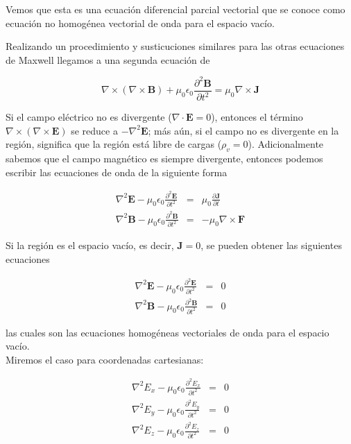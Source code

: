 Vemos que esta es una ecuación diferencial parcial vectorial que se conoce como ecuación no homogénea vectorial de onda para el espacio vacío. 

Realizando un procedimiento y susticuciones similares para las otras ecuaciones de Maxwell llegamos a una segunda ecuación de 

\begin{equation*}
\nabla \times \left( \nabla \times \mathbf{B} \right) + \mu_0 \epsilon_0 \frac{\partial^2 \mathbf{B}}{\partial t^2} = \mu_0 \nabla \times \mathbf{J}
\end{equation*}

Si el campo eléctrico no es divergente ($\nabla \cdot \mathbf{E}=0$), entonces el término $\nabla \times (\nabla \times \mathbf{E})$ se reduce a $-\nabla^2 \mathbf{E}$; más aún, si el campo no es divergente en la región, significa que la región está libre de cargas ($\rho_v=0$). Adicionalmente sabemos que el campo magnético es siempre divergente, entonces podemos escribir las ecuaciones de onda de la siguiente forma

\begin{eqnarray*}
\nabla^2 \mathbf{E} - \mu_0 \epsilon_0 \frac{\partial^2 \mathbf{E}}{\partial t^2} &=& \mu_0 \frac{\partial \mathbf{J}}{\partial t} \\
\nabla^2 \mathbf{B} - \mu_0 \epsilon_0 \frac{\partial^2 \mathbf{B}}{\partial t^2} &=& -\mu_0 \nabla \times \mathbf{F}
\end{eqnarray*}


Si la región es el espacio vacío, es decir, $\mathbf{J}=0$, se pueden obtener las siguientes ecuaciones 

\begin{eqnarray*}
\nabla^2 \mathbf{E} - \mu_0 \epsilon_0 \frac{\partial^2 \mathbf{E}}{\partial t^2} &=& 0 \\
\nabla^2 \mathbf{B} - \mu_0 \epsilon_0 \frac{\partial^2 \mathbf{B}}{\partial t^2} &=& 0
\end{eqnarray*}

las cuales son las ecuaciones homogéneas vectoriales de onda para el espacio vacío.\\


Miremos el caso para coordenadas cartesianas:

\begin{eqnarray*}
\nabla^2 E_x - \mu_0 \epsilon_0 \frac{\partial^2 E_x}{\partial t^2} &=& 0 \\
\nabla^2 E_y - \mu_0 \epsilon_0 \frac{\partial^2 E_y}{\partial t^2} &=& 0 \\
\nabla^2 E_z - \mu_0 \epsilon_0 \frac{\partial^2 E_z}{\partial t^2} &=& 0 
\end{eqnarray*}

